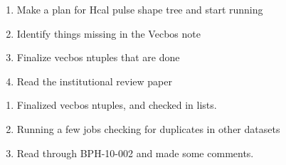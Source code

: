 

\begin{enumerate}
\item Make a plan for Hcal pulse shape tree and start running
\item Identify things missing in the Vecbos note
\item Finalize vecbos ntuples that are done
\item Read the institutional review paper
\end{enumerate}


\begin{enumerate}
\item Finalized vecbos ntuples, and checked in lists.
\item Running a few jobs checking for duplicates in other datasets
\item Read through BPH-10-002 and made some comments.
\end{enumerate}


